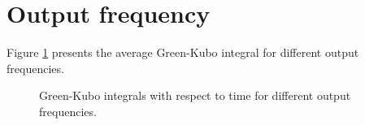 \documentclass[preprint,review,11pt]{elsarticle}
\begin{document}
    \clearpage
    \newpage

    \section{Output frequency} \label{SI:Output frequency}
    
    Figure \ref{fig:compare_output_frequency} presents the average Green-Kubo integral for different output frequencies. 	
    
    \begin{figure}[htb!]
    	\centering
    	\caption{Green-Kubo integrals with respect to time for different output frequencies.}
    	\label{fig:compare_output_frequency}
    \end{figure}

		
%		
%	
%	
%	
	
\end{document}
